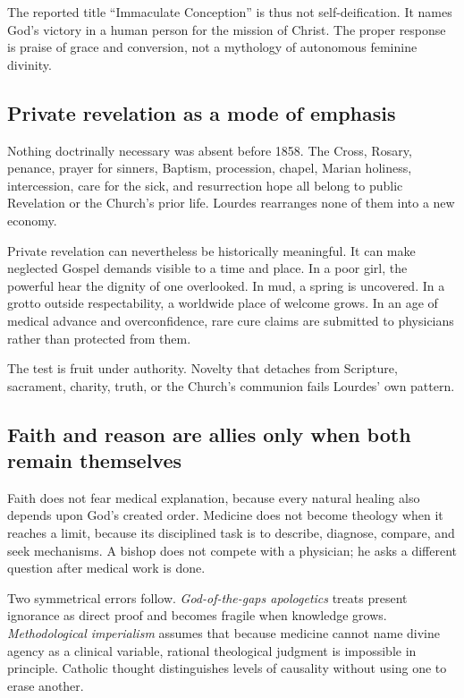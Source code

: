 The reported title “Immaculate Conception” is thus not self-deification. It names God's victory in a human person for the mission of Christ. The proper response is praise of grace and conversion, not a mythology of autonomous feminine divinity.

\subsection{Private revelation as a mode of emphasis}

Nothing doctrinally necessary was absent before 1858. The Cross, Rosary, penance, prayer for sinners, Baptism, procession, chapel, Marian holiness, intercession, care for the sick, and resurrection hope all belong to public Revelation or the Church's prior life. Lourdes rearranges none of them into a new economy.

Private revelation can nevertheless be historically meaningful. It can make neglected Gospel demands visible to a time and place. In a poor girl, the powerful hear the dignity of one overlooked. In mud, a spring is uncovered. In a grotto outside respectability, a worldwide place of welcome grows. In an age of medical advance and overconfidence, rare cure claims are submitted to physicians rather than protected from them.

The test is fruit under authority. Novelty that detaches from Scripture, sacrament, charity, truth, or the Church's communion fails Lourdes' own pattern.

\subsection{Faith and reason are allies only when both remain themselves}

Faith does not fear medical explanation, because every natural healing also depends upon God's created order. Medicine does not become theology when it reaches a limit, because its disciplined task is to describe, diagnose, compare, and seek mechanisms. A bishop does not compete with a physician; he asks a different question after medical work is done.

Two symmetrical errors follow. \emph{God-of-the-gaps apologetics} treats present ignorance as direct proof and becomes fragile when knowledge grows. \emph{Methodological imperialism} assumes that because medicine cannot name divine agency as a clinical variable, rational theological judgment is impossible in principle. Catholic thought distinguishes levels of causality without using one to erase another.

